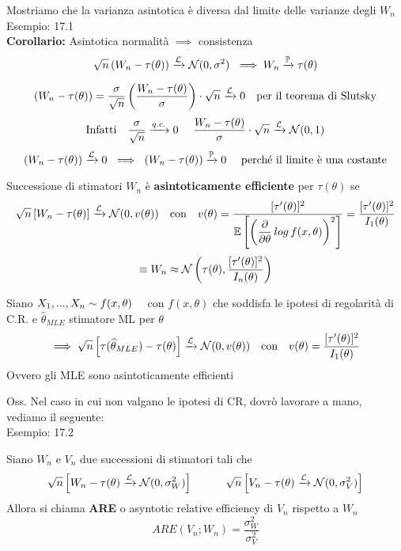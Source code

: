 Mostriamo che la varianza asintotica è diversa dal limite delle varianze degli $W_n$ \\

Esempio: 17.1\\


\textbf{Corollario:} Asintotica normalità $\implies $ consistenza
\[
\sqrt{n}\left( W_n -\tau(\theta) \right)\xrightarrow{\mathcal L} \mathcal N(0,\sigma^2) \ \implies W_n \xrightarrow{\mathbb P}\tau(\theta)
\]


\begin{Dim}
\[
\left( W_n - \tau(\theta) \right) = \dfrac{\sigma}{\sqrt{n}} \left( \dfrac{W_n -\tau(\theta)}{\sigma} \right) \cdot \sqrt{n} \xrightarrow{\mathcal L} 0  \ \ \text{ per il teorema di Slutsky}
\]
\[
\text{Infatti } \ \ \frac{\sigma}{\sqrt{n}} \xrightarrow{q.c.}0 \ \ \ \ \frac{W_n -\tau(\theta)}{\sigma} \cdot \sqrt{n} \xrightarrow{\Lc} \Nc(0,1)
\]
\[
\left( W_n - \tau(\theta) \right) \xrightarrow{\mathcal L} 0 \ \implies \ \left( W_n - \tau(\theta) \right) \xrightarrow{\mathbb P} 0 \ \ \ \text{ perché il limite è una costante}
\]
\end{Dim}

\begin{defi}
    Successione di stimatori $W_n$ è \textbf{asintoticamente efficiente} per $\tau(\theta)$ se
    \[
    \sqrt{n}\left[ W_n -\tau(\theta)\right] \xrightarrow{\mathcal L} \mathcal N (0, v(\theta)) \ \ \text{ con } \ \ v(\theta) = \dfrac{[\tau'(\theta)]^2}{\mathbb{E} \left[ \left(\dfrac{\partial}{\partial \theta}\, log\, f(x,\theta)\right)^2 \right]} = \dfrac{[\tau'(\theta)]^2}{I_1(\theta)}
    \]
    \[
    \equiv W_n \approx \mathcal N \left( \tau(\theta), \dfrac{[\tau'(\theta)]^2}{I_n(\theta)} \right)
    \]
\end{defi}

\phantom{}

\begin{teo}
Siano $X_1,...,X_n \sim f(x,\theta)$ \ \ con $f(x,\theta)$ che soddisfa le ipotesi di regolarità di C.R. e $\hat{\theta}_{MLE}$ stimatore ML per $\theta$
\[
\implies \sqrt{n}\OO \tau(\hat{\theta}_{MLE}) -\tau(\theta) \CC \xrightarrow{\Lc} \Nc(0,v(\theta)) \ \ \text{ con } \ \ v(\theta)=\frac{[\tau'(\theta)]^2}{I_1(\theta)}
\]
Ovvero gli MLE sono asintoticamente efficienti
\end{teo}


Oss. Nel caso in cui non valgano le ipotesi di CR, dovrò lavorare a mano, vediamo il seguente:\\

Esempio: 17.2\\

\begin{defi}
    Siano $W_n$ e $V_n$ due successioni di stimatori tali che
    \[
    \sqrt{n}\left[ W_n -\tau(\theta) \xrightarrow{\mathcal L} \mathcal N (0,\sigma_W^2) \right] \hspace{30 pt}
    \sqrt{n}\left[ V_n -\tau(\theta) \xrightarrow{\mathcal L} \mathcal N (0,\sigma_V^2) \right]
    \]
    Allora si chiama \textbf{ARE} o asyntotic relative efficiency di $V_n$ rispetto a $W_n$
    \[
    ARE(V_n; W_n) = \frac{\sigma^2_W}{\sigma^2_V}
    \]
\end{defi}

